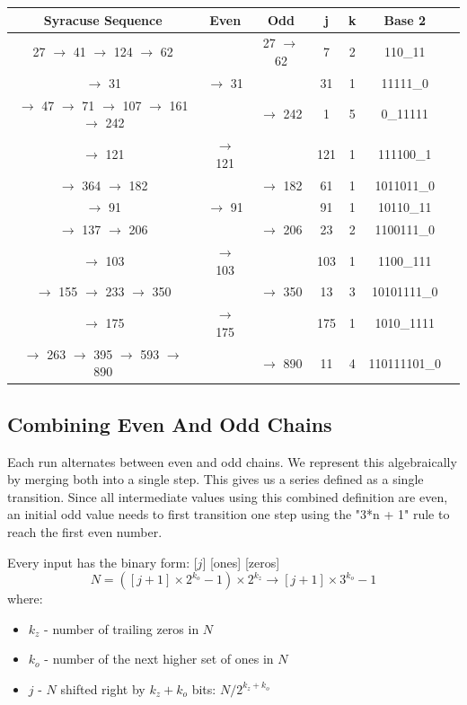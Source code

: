 \documentclass[letterpaper]{article}
\begin{document}
\begin{multicols}{2}
\begin{center}
\begin{tabular}{|c|c|c|c|c|c|c|}
\hline
\textbf{Syracuse Sequence} & \textbf{Even} & \textbf{Odd} & \textbf{j} & \textbf{k} & \textbf{Base 2} \\ 
\hline
27 $\to$ 41 $\to$ 124 $\to$ 62&&27 $\to$ 62&7&2&110\_11 \\ 
\hline
$\to$ 31&$\to$ 31&&31&1&11111\_0 \\ 
\hline
$\to$ 47 $\to$ 71 $\to$ 107 $\to$ 161 $\to$ 242&&$\to$ 242&1&5&0\_11111 \\ 
\hline
$\to$ 121&$\to$ 121&&121&1&111100\_1 \\ 
\hline
$\to$ 364 $\to$ 182&&$\to$ 182&61&1&1011011\_0 \\ 
\hline
$\to$ 91&$\to$ 91&&91&1&10110\_11 \\ 
\hline
$\to$ 137 $\to$ 206&&$\to$ 206&23&2&1100111\_0 \\ 
\hline
$\to$ 103&$\to$ 103&&103&1&1100\_111 \\ 
\hline
$\to$ 155 $\to$ 233 $\to$ 350&&$\to$ 350&13&3&10101111\_0 \\ 
\hline
$\to$ 175&$\to$ 175&&175&1&1010\_1111 \\ 
\hline
$\to$ 263 $\to$ 395 $\to$ 593 $\to$ 890&&$\to$ 890&11&4&110111101\_0 \\ 
\hline
\end{tabular}
\end{center}

\subsection{Combining Even And Odd Chains}

Each run alternates between even and odd chains. We represent this algebraically by merging both into a single step. This gives us a series defined as a single transition. Since all intermediate values using this combined definition are even, an initial odd value needs to first transition one step using the "3*n + 1" rule to reach the first even number.

Every input has the binary form: [$j$] [ones] [zeros]
\[
N = ([j + 1] \times 2^{k_o} - 1) \times 2^{k_z} \rightarrow [j + 1] \times 3^{k_o} - 1
\]
where:
\begin{itemize}
    \item $k_z$ - number of trailing zeros in $N$
    \item $k_o$ - number of the next higher set of ones in $N$
    \item $j$ - $N$ shifted right by $k_z + k_o$ bits: $N / 2^{k_z + k_o}$
\end{itemize}


\end{multicols}
\end{document}
